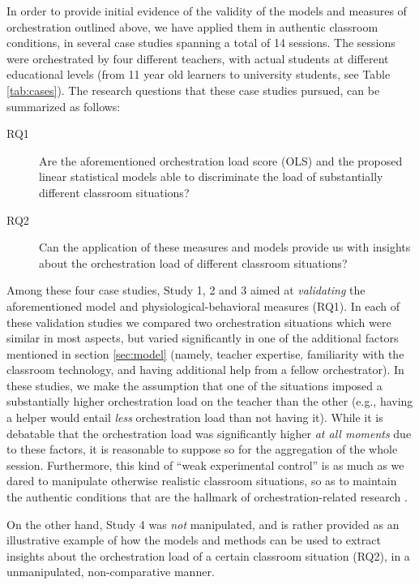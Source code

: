 \documentclass[10pt,journal,compsoc]{IEEEtran}
\begin{document}
In order to provide initial evidence of the validity of the models and measures of orchestration outlined above, we have applied them in authentic classroom conditions, in several case studies spanning a total of 14 sessions. The sessions were orchestrated by four different teachers, with actual students at different educational levels (from 11 year old learners to university students, see Table \ref{tab:cases}). The research questions that these case studies pursued, can be summarized as follows:

\begin{description}
\item[RQ1] Are the aforementioned orchestration load score (OLS) and the proposed linear statistical models able to discriminate the load of substantially different classroom situations?
\item[RQ2] Can the application of these measures and models provide us with insights about the orchestration load of different classroom situations?
\end{description}

Among these four case studies, Study 1, 2 and 3 aimed at \textit{validating} the aforementioned model and physiological-behavioral measures (RQ1). In each of these validation studies we compared two orchestration situations which were similar in most aspects, but varied significantly in one of the additional factors mentioned in section \ref{sec:model} (namely, teacher expertise, familiarity with the classroom technology, and having additional help from a fellow orchestrator). In these studies, we make the assumption that one of the situations imposed a substantially higher orchestration load on the teacher than the other (e.g., having a helper would entail \textit{less} orchestration load than not having it). While it is debatable that the orchestration load was significantly higher \textit{at all moments} due to these factors, it is reasonable to suppose so for the aggregation of the whole session. Furthermore, this kind of ``weak experimental control'' is as much as we dared to manipulate otherwise realistic classroom situations, so as to maintain the authentic conditions that are the hallmark of orchestration-related research \cite{Roschelle2013}.

On the other hand, Study 4 was \textit{not} manipulated, and is rather provided as an illustrative example of how the models and methods can be used to extract insights about the orchestration load of a certain classroom situation (RQ2), in a unmanipulated, non-comparative manner.
\end{document}

